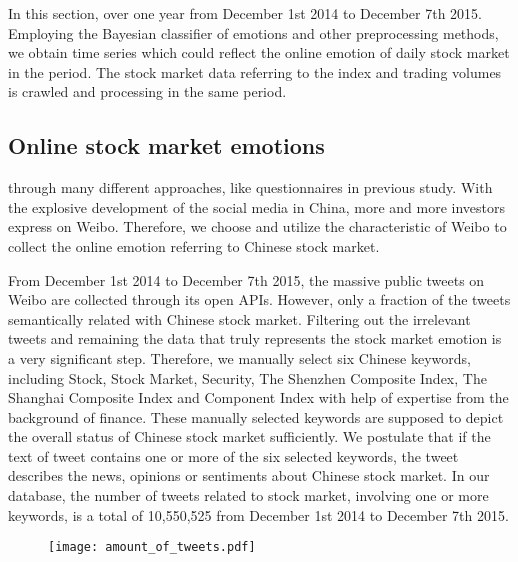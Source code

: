 \documentclass[aps,preprint,groupedaddress]{revtex4-1}
\begin{document}
In this section, {\color{black}{the data sets will be depicted. We obtain over 10 million public stock-relevant tweets on Weibo through its open APIs}} over one year from December 1st 2014 to December 7th 2015. Employing the Bayesian classifier of emotions and other preprocessing methods, we obtain time series which could reflect the online emotion of daily stock market in the period. The stock market data referring to the index and trading volumes is crawled and processing in the same period.

\subsection{Online stock market emotions}
\label{online_emotions}
{\color{black}{The Emotions of investors can be obtained}} through many different approaches, like questionnaires in previous study. With the explosive development of the social media in China, more and more investors express {\color{black}{their feelings}} on Weibo. Therefore, we choose and utilize the characteristic of Weibo to collect the online emotion referring to Chinese stock market.

From December 1st 2014 to December 7th 2015, the massive public tweets on Weibo are collected through its open APIs. However, only a fraction of the tweets {\color{black}{is}} semantically related with Chinese stock market. Filtering out the irrelevant tweets and remaining the data that truly represents the stock market emotion is a very significant step. Therefore, we manually select six Chinese keywords, including Stock, Stock Market, Security, The Shenzhen Composite Index, The Shanghai Composite Index and Component Index with help of expertise from the background of finance. These manually selected keywords are supposed to depict the overall status of Chinese stock market sufficiently. We postulate that if the text of tweet contains one or more of the six selected keywords, the tweet describes the news, opinions or sentiments about Chinese stock market. In our database, the number of tweets related to stock market, involving one or more keywords, is a total of 10,550,525 from December 1st 2014 to December 7th 2015.
 
\begin{figure}
\centering
\texttt{[image: amount\_of\_tweets.pdf]}
\caption{{\color{black}{Volume of the stock-relevant tweets from September 1st to 16th in 2015. There are respectively Memorial Day between 9-3 and 9-5 and a weekend between 9-12 and 9-13, which are also non-trading days.}}}
\label{fig:amount_of_tweets}
\end{figure}
\end{document}
